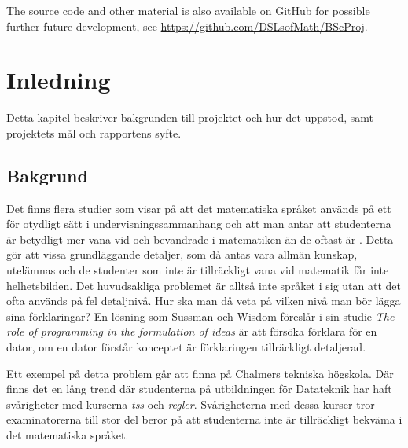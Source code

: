 \documentclass[12pt,a4paper,twoside,openright]{article}
\begin{document}
The source code and other material is also available on GitHub for
possible further future development, see
\url{https://github.com/DSLsofMath/BScProj}.

\newpage


\tableofcontents

\newpage

\setlength{\parskip}{1mm}
\printglossaries

\newpage

\setcounter{page}{1}
\setlength{\parskip}{2mm plus2mm}

\section{Inledning}
\begin{flushleft}
Detta kapitel beskriver bakgrunden till projektet och hur det
uppstod, samt projektets mål och rapportens syfte.
\end{flushleft}

\subsection{Bakgrund}
\label{sec:bakgrund}
Det finns flera studier som visar på att det matematiska språket
används på ett för otydligt sätt i undervisningssammanhang och att man
antar att studenterna är betydligt mer vana vid och bevandrade i
matematiken än de oftast är \cite{sussman2002role}
\cite{wells1995communicating}. Detta gör att vissa grundläggande
detaljer, som då antas vara allmän kunskap, utelämnas och de studenter
som inte är tillräckligt vana vid matematik får inte helhetsbilden.
Det huvudsakliga problemet är alltså inte språket i sig utan att det
ofta används på fel detaljnivå. Hur ska man då veta på vilken nivå man
bör lägga sina förklaringar? En lösning som Sussman och Wisdom
föreslår i sin studie \textit{The role of programming in the
  formulation of ideas} \cite{sussman2002role} är att försöka förklara
för en dator, om en dator förstår konceptet är förklaringen
tillräckligt detaljerad.

Ett exempel på detta problem går att finna på Chalmers tekniska
högskola. Där finns det en lång trend där studenterna på utbildningen
för Datateknik har haft svårigheter med kurserna \textit{\gls{tss}}
och \textit{\gls{regler}}. Svårigheterna med dessa kurser tror
examinatorerna till stor del beror på att studenterna inte är
tillräckligt bekväma i det matematiska språket.
\end{document}
